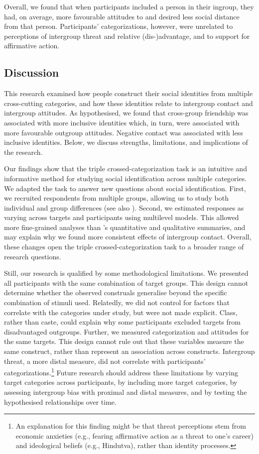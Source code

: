 \documentclass[12pt, a4paper]{article}
\begin{document}
Overall, we found that when participants included a person in their ingroup, they had, on average, more favourable attitudes to and desired less social distance from that person. Participants' categorizations, however, were unrelated to perceptions of intergroup threat and relative (dis-)advantage, and to support for affirmative action.

\subsection{Discussion}

This research examined how people construct their social identities from multiple cross-cutting categories, and how these identities relate to intergroup contact and intergroup attitudes. As hypothesised, we found that cross-group friendship was associated with more inclusive identities which, in turn, were associated with more favourable outgroup attitudes. Negative contact was associated with less inclusive identities. Below, we discuss strengths, limitations, and implications of the research.

Our findings show that the triple crossed-categorization task \cite{dommelen_construing_2015} is an intuitive and informative method for studying social identification across multiple categories. We adapted the task to answer new questions about social identification. First, we recruited respondents from multiple groups, allowing us to study both individual and group differences (see also ). Second, we estimated responses as varying across targets and participants using multilevel models. This allowed more fine-grained analyses than \citeauthor{dommelen_construing_2015}’s quantitative and qualitative summaries, and may explain why we found more consistent effects of intergroup contact. Overall, these changes open the triple crossed-categorization task to a broader range of research questions.

Still, our research is qualified by some methodological limitations. We presented all participants with the same combination of target groups. This design cannot determine whether the observed construals generalise beyond the specific combination of stimuli used. Relatedly, we did not control for factors that correlate with the categories under study, but were not made explicit. Class, rather than caste, could explain why some participants excluded targets from disadvantaged outgroups. Further, we measured categorization and attitudes for the same targets. This design cannot rule out that these variables measure the same construct, rather than represent an association across constructs. Intergroup threat, a more distal measure, did not correlate with participants' categorizations.\footnote{An explanation for this finding might be that threat perceptions stem from economic anxieties (e.g., fearing affirmative action as a threat to one's career) and ideological beliefs (e.g., Hindutva), rather than identity processes.} Future research should address these limitations by varying target categories across participants, by including more target categories, by assessing intergroup bias with proximal and distal measures, and by testing the hypothesised relationships over time.
\end{document}
